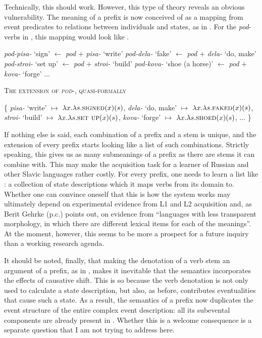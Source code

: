\documentclass[output=paper,colorlinks,citecolor=brown]{langscibook}
\begin{document}
\largerpage[2]
\noindent Technically, this should work. However, this type of theory reveals an obvious vulnerability. The meaning of a prefix is now conceived of as a mapping from event predicates to relations between individuals and states, as in . For the \textit{pod}-verbs in , this mapping would look like .

\ea\label{ex:tatevosov:116}
\ea    \textit{pod-pisa-} ‘sign’   $\leftarrow$   \textit{pod} $+$ \textit{pisa-} ‘write’
\ex     \textit{pod-dela-} ‘fake’   $\leftarrow$   \textit{pod} $+$ \textit{dela-} ‘do, make’
\ex     \textit{pod-stroi-} ‘set up’   $\leftarrow$   \textit{pod} $+$ \textit{stroi-} ‘build’
\ex      \textit{pod-kova-} ‘shoe (a horse)’   $\leftarrow$   \textit{pod} $+$ \textit{kova-} ‘forge’
\ex ...
\z
\z

\ea   \textsc{The extension of \textit{pod}-, quasi-formally}\label{ex:tatevosov:117}

\{ \textit{pisa-} ‘write’ $\mapsto $ $\lambda x.\lambda s.\textsc{signed}(x)(s)$, \textit{dela-} ‘do, make’ $\mapsto $ $\lambda x. \lambda s.\textsc{faked}(x)(s)$, \textit{stroi-} ‘build’ $\mapsto$ $\lambda x.\lambda s.\textsc{set up}(x)(s)$, \textit{kova-} ‘forge’ $\mapsto$ $\lambda x.\lambda s.\textsc{shoed}(x)(s)$, ... \}
\z

\noindent If nothing else is said, each combination of a prefix and a stem is unique, and the extension of every prefix starts looking like a list of such combinations. Strictly speaking, this gives us as many submeanings of a prefix as there are stems it can combine with. This may make the acquisition task for a learner of Russian and other Slavic languages rather costly. For every prefix, one needs to learn a list like : a collection of state descriptions which it maps verbs from its domain to. Whether one can convince oneself that this is how the system works may ultimately depend on experimental evidence from L1 and L2 acquisition and, as Berit Gehrke (p.c.) points out, on evidence from “languages with less transparent morphology, in which there are different lexical items for each of the meanings”. At the moment, however, this seems to be more a prospect for a future inquiry than a working research agenda.

It should be noted, finally, that making the denotation of a verb stem an argument of a prefix, as in , makes it inevitable that the semantics incorporates the effects of causative shift. This is so because the verb denotation is not only used to calculate a state description, but also, as before, contributes eventualities that cause such a state. As a result, the semantics of a prefix now duplicates the event structure of the entire complex event description: all its subevental components are already present in . Whether this is a welcome consequence is a separate question that I am not trying to address here.
\end{document}
